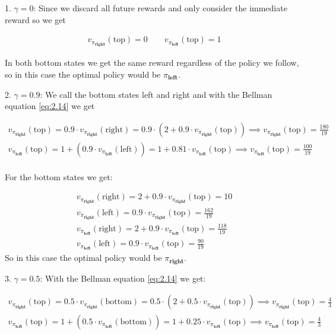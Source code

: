 \begin{solution}
1. $\gamma = 0$: Since we discard all future rewards and only consider the immediate reward so we get

\begin{align*}
  v_{\pi_\textbf{right}}(\text{top}) = 0 \qquad
  v_{\pi_\textbf{left}}(\text{top}) = 1
\end{align*}

In both bottom states we get the same reward regardless of the policy we follow,
so in this case the optimal policy would be $\pi_\textbf{left}$.

2. $\gamma = 0.9$: We call the bottom states left and right and with the Bellman equation \eqref{eq:2.14} we get

\begin{align*}
  v_{\pi_\textbf{right}}(\text{top})
  =
  0.9 \cdot v_{\pi_\textbf{right}}(\text{right})
  =
  0.9 \cdot (2 + 0.9 \cdot v_{\pi_\textbf{right}}(\text{top}))
  \implies
  v_{\pi_\textbf{right}}(\text{top}) = \frac{180}{19} \\
  v_{\pi_\textbf{left}}(\text{top})
  =
  1 + (0.9 \cdot v_{\pi_\textbf{left}}(\text{left}))
  =
  1 + 0.81 \cdot v_{\pi_\textbf{left}}(\text{top})
  \implies
  v_{\pi_\textbf{left}}(\text{top}) = \frac{100}{19} \\
\end{align*}

For the bottom states we get:

\begin{align*}
  v_{\pi_\textbf{right}}(\text{right})
  =
  2 + 0.9 \cdot v_{\pi_\textbf{right}}(\text{top})
  =
  10\\
  v_{\pi_\textbf{right}}(\text{left})
  =
  0.9 \cdot v_{\pi_\textbf{right}}(\text{top})
  =
  \frac{162}{19}\\
  v_{\pi_\textbf{left}}(\text{right})
  =
  2 + 0.9 \cdot v_{\pi_\textbf{left}}(\text{top})
  =
  \frac{118}{19} \\
  v_{\pi_\textbf{left}}(\text{left})
  =
  0.9 \cdot v_{\pi_\textbf{left}}(\text{top})
  =
  \frac{90}{19}
\end{align*}
So in this case the optimal policy would be $\pi_\textbf{right}$.

3. $\gamma = 0.5$: With the Bellman equation \eqref{eq:2.14} we get:

\begin{align*}
v_{\pi_\textbf{right}}(\text{top})
=
0.5 \cdot v_{\pi_\textbf{right}}(\text{bottom})
=
0.5 \cdot (2 + 0.5 \cdot v_{\pi_\textbf{right}}(\text{top}))
\implies
v_{\pi_\textbf{right}}(\text{top}) = \frac{4}{3} \\
v_{\pi_\textbf{left}}(\text{top})
=
1 + (0.5 \cdot v_{\pi_\textbf{left}}(\text{bottom}))
=
1 + 0.25 \cdot v_{\pi_\textbf{left}}(\text{top})
\implies
v_{\pi_\textbf{left}}(\text{top}) = \frac{4}{3}
\end{align*}


\end{solution}
